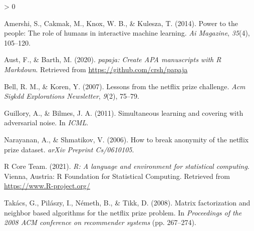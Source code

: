 \documentclass[
  english,
  man,floatsintext]{apa6}
\newlength{\cslhangindent}
\newenvironment{CSLReferences}[2] %
 {%
  \setlength{\parindent}{0pt}
  \ifodd #1 \everypar{\setlength{\hangindent}{\cslhangindent}}\ignorespaces\fi
  \ifnum #2 > 0
  \setlength{\parskip}{#2\baselineskip}
  \fi
 }%
 {}
\begin{document}
\hypertarget{refs}{}
\begin{CSLReferences}{1}{0}
\leavevmode\hypertarget{ref-amershi2014power}{}%
Amershi, S., Cakmak, M., Knox, W. B., \& Kulesza, T. (2014). Power to the people: The role of humans in interactive machine learning. \emph{Ai Magazine}, \emph{35}(4), 105--120.

\leavevmode\hypertarget{ref-R-papaja}{}%
Aust, F., \& Barth, M. (2020). \emph{{papaja}: {Create} {APA} manuscripts with {R Markdown}}. Retrieved from \url{https://github.com/crsh/papaja}

\leavevmode\hypertarget{ref-bell2007lessons}{}%
Bell, R. M., \& Koren, Y. (2007). Lessons from the netflix prize challenge. \emph{Acm Sigkdd Explorations Newsletter}, \emph{9}(2), 75--79.

\leavevmode\hypertarget{ref-guillory2011simultaneous}{}%
Guillory, A., \& Bilmes, J. A. (2011). Simultaneous learning and covering with adversarial noise. In \emph{ICML}.

\leavevmode\hypertarget{ref-narayanan2006break}{}%
Narayanan, A., \& Shmatikov, V. (2006). How to break anonymity of the netflix prize dataset. \emph{arXiv Preprint Cs/0610105}.

\leavevmode\hypertarget{ref-R-base}{}%
R Core Team. (2021). \emph{R: A language and environment for statistical computing}. Vienna, Austria: R Foundation for Statistical Computing. Retrieved from \url{https://www.R-project.org/}

\leavevmode\hypertarget{ref-takacs2008matrix}{}%
Takács, G., Pilászy, I., Németh, B., \& Tikk, D. (2008). Matrix factorization and neighbor based algorithms for the netflix prize problem. In \emph{Proceedings of the 2008 ACM conference on recommender systems} (pp. 267--274).

\end{CSLReferences}

\endgroup
\end{document}
